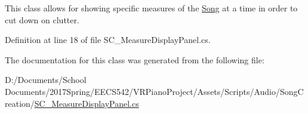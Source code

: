 This class allows for showing specific measures of the \hyperlink{class_song}{Song} at a time in order to cut down on clutter. 

Definition at line 18 of file S\+C\+\_\+\+Measure\+Display\+Panel.\+cs.



The documentation for this class was generated from the following file\+:\begin{DoxyCompactItemize}
\item 
D\+:/\+Documents/\+School Documents/2017\+Spring/\+E\+E\+C\+S542/\+V\+R\+Piano\+Project/\+Assets/\+Scripts/\+Audio/\+Song\+Creation/\hyperlink{_s_c___measure_display_panel_8cs}{S\+C\+\_\+\+Measure\+Display\+Panel.\+cs}\end{DoxyCompactItemize}
